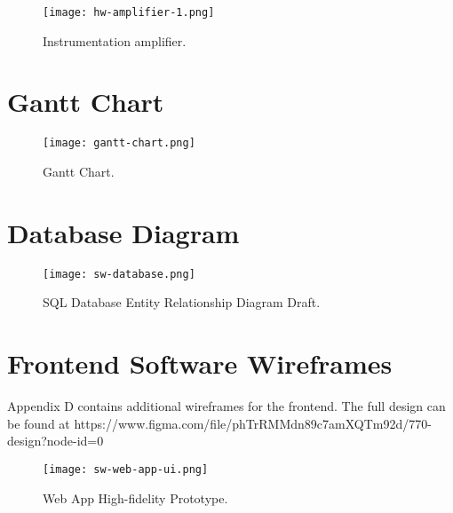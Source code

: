 \begin{figure}[!ht]
	\centering
	\texttt{[image: hw-amplifier-1.png]}
	\caption{Instrumentation amplifier.}
	\label{fig:amplifier-2}
\end{figure}

\chapter{Gantt Chart}

\begin{figure}[!ht]
	\centering
	\texttt{[image: gantt-chart.png]}
	\caption{Gantt Chart.}
	\label{fig:gantt-chart-1}
\end{figure}

\chapter{Database Diagram}

\begin{figure}[!ht]
	\centering
	\texttt{[image: sw-database.png]}
	\caption{SQL Database Entity Relationship Diagram Draft.}
	\label{fig:database-1}
\end{figure}

\chapter{Frontend Software Wireframes}

Appendix D contains additional wireframes for the frontend. The full design can be found at https://www.figma.com/file/phTrRMMdn89c7amXQTm92d/770-design?node-id=0%

\begin{figure}[!ht]
	\centering
	\texttt{[image: sw-web-app-ui.png]}
	\caption{Web App High-fidelity Prototype.}
	\label{fig:webapp-1}
\end{figure}



